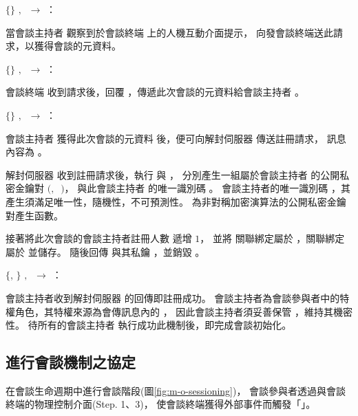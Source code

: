 \begin{pmsgsi}
    \item $\{\}$ $,~$ \DEFowner $\rightarrow$ \DEFmeetingbox：

        當會談主持者 \DEFowner 觀察到於會談終端 \DEFmeetingbox 上的人機互動介面提示，
    向發會談終端送此請求，以獲得會談的元資料。

    \item $\{$\DEFsessionID$\}$ $,~$ \DEFmeetingbox $\rightarrow$ \DEFowner：

        會談終端 \DEFmeetingbox 收到請求後，回覆 \DEFsessionID，傳遞此次會談的元資料給會談主持者 \DEFowner。

    \item $\{$\DEFsessionID$\}$ $,~$ \DEFowner $\rightarrow$ \DEFserver：

        會談主持者 \DEFowner 獲得此次會談的元資料 \DEFsessionID 後，便可向解封伺服器 \DEFserver 傳送註冊請求，
    訊息內容為 \DEFsessionID。

        解封伺服器 \DEFserver 收到註冊請求後，執行 \DEFfuncPKgen{} 與 \DEFfuncIDgen{}，
    分別產生一組屬於會談主持者 \DEFowner 的公開私密金鑰對 $($\DEFpublicKey$,~$ \DEFprivateKey$)$，
    與此會談主持者 \DEFowner 的唯一識別碼 \DEFownerID。
    會談主持者的唯一識別碼 \DEFownerID，其產生須滿足唯一性，隨機性，不可預測性。
    \DEFfuncPKgen{} 為非對稱加密演算法的公開私密金鑰對產生函數。

        接著將此次會談的會談主持者註冊人數 \DEFowreg 遞增 $1$，
    並將 \DEFownerID 關聯綁定屬於 \DEFsessionID，\DEFpublicKey 關聯綁定屬於 \DEFownerID 並儲存。
    隨後回傳 \DEFownerID 與其私鑰 \DEFprivateKey，並銷毀 \DEFprivateKey。

    \item $\{$\DEFownerID, \DEFprivateKey$\}$ $,~$ \DEFserver $\rightarrow$ \DEFowner：

        會談主持者收到解封伺服器 \DEFserver 的回傳即註冊成功。
    會談主持者為會談參與者中的特權角色，其特權來源為會傳訊息內的 \DEFprivateKey，
    因此會談主持者須妥善保管 \DEFprivateKey，維持其機密性。
    待所有的會談主持者 \DEFownerAll 執行成功此機制後，即完成會談初始化。
\end{pmsgsi}


\subsection{進行會談機制之協定}

    在會談生命週期中進行會談階段(圖\ref{fig:m-o-sessioning})，
會談參與者透過與會談終端的物理控制介面(Step. 1、3)，
使會談終端獲得外部事件而觸發「」。

